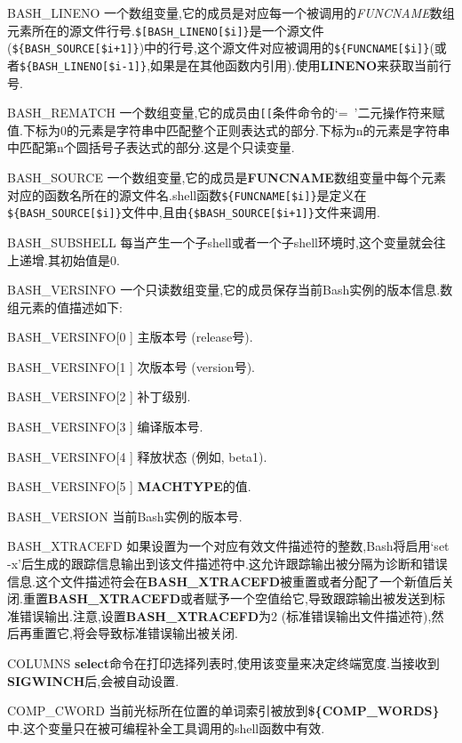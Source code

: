\documentclass[draft,openany]{book}
\begin{document}
\begin{CJK}{UTF8}{gbsn}
\begin{basedescript}{\desclabelstyle{\nextlinelabel}\desclabelwidth{2.5em}}
    \item[BASH\_LINENO] 一个数组变量,它的成员是对应每一个被调用的\emph{FUNCNAME}数组元素所在的源文件行号.\verb+$[BASH_LINENO[$i]}+是一个源文件(\verb-${BASH_SOURCE[$i+1]}-)中的行号,这个源文件对应被调用的\verb+${FUNCNAME[$i]}+(或者\verb+${BASH_LINENO[$i-1]}+,如果是在其他函数内引用).使用\textbf{LINENO}来获取当前行号.
    \item[BASH\_REMATCH] 一个数组变量,它的成员由\verb+[[+条件命令的`=~'二元操作符来赋值.下标为0的元素是字符串中匹配整个正则表达式的部分.下标为n的元素是字符串中匹配第n个圆括号子表达式的部分.这是个只读变量.
    \item[BASH\_SOURCE] 一个数组变量,它的成员是\textbf{FUNCNAME}数组变量中每个元素对应的函数名所在的源文件名.shell函数\verb+${FUNCNAME[$i]}+是定义在\verb+${BASH_SOURCE[$i]}+文件中,且由\verb-{$BASH_SOURCE[$i+1]}-文件来调用.
    \item[BASH\_SUBSHELL] 每当产生一个子shell或者一个子shell环境时,这个变量就会往上递增.其初始值是0.
    \item[BASH\_VERSINFO] 一个只读数组变量,它的成员保存当前Bash实例的版本信息.数组元素的值描述如下:
        \begin{basedescript}{\desclabelstyle{\nextlinelabel}\desclabelwidth{2.5em}}
        \item[BASH\_VERSINFO[0]] 主版本号 (release号).
        \item[BASH\_VERSINFO[1]] 次版本号 (version号).
        \item[BASH\_VERSINFO[2]] 补丁级别.
        \item[BASH\_VERSINFO[3]] 编译版本号.
        \item[BASH\_VERSINFO[4]] 释放状态 (例如, beta1).
        \item[BASH\_VERSINFO[5]] \textbf{MACHTYPE}的值.
        \end{basedescript}
    \item[BASH\_VERSION] 当前Bash实例的版本号.
    \item[BASH\_XTRACEFD] 如果设置为一个对应有效文件描述符的整数,Bash将启用`set -x'后生成的跟踪信息输出到该文件描述符中.这允许跟踪输出被分隔为诊断和错误信息.这个文件描述符会在\textbf{BASH\_XTRACEFD}被重置或者分配了一个新值后关闭.重置\textbf{BASH\_XTRACEFD}或者赋予一个空值给它,导致跟踪输出被发送到标准错误输出.注意,设置\textbf{BASH\_XTRACEFD}为2 (标准错误输出文件描述符),然后再重置它,将会导致标准错误输出被关闭.
    \item[COLUMNS] \textbf{select}命令在打印选择列表时,使用该变量来决定终端宽度.当接收到\textbf{SIGWINCH}后,会被自动设置.
    \item[COMP\_CWORD] 当前光标所在位置的单词索引被放到\textbf{\$\{COMP\_WORDS\}}中.这个变量只在被可编程补全工具调用的shell函数中有效.

\end{basedescript}
\end{CJK}
\end{document}
